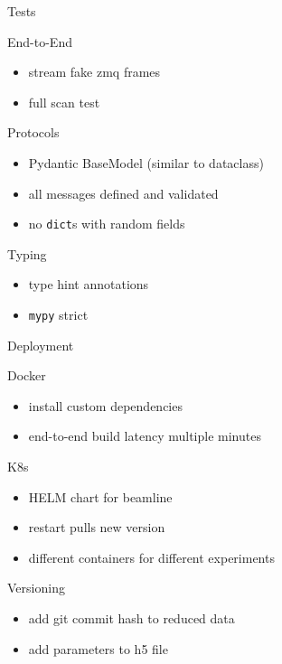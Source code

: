 \documentclass[aspectratio=169]{beamer}
\begin{document}
\begin{frame}{Tests}
 \begin{block}{End-to-End}
  \begin{itemize}
   \item stream fake zmq frames
   \item full scan test
  \end{itemize}

 \end{block}
 \begin{block}{Protocols}
  \begin{itemize}
   \item Pydantic BaseModel (similar to dataclass)
   \item all messages defined and validated
   \item no \texttt{dict}s with random fields
  \end{itemize}
 \end{block}

\begin{block}{Typing}
 \begin{itemize}
 \item type hint annotations
  \item \texttt{mypy} strict
 \end{itemize}

\end{block}


\end{frame}

\begin{frame}{Deployment}
 \begin{block}{Docker}
  \begin{itemize}
   \item install custom dependencies
   \item end-to-end build latency multiple minutes
  \end{itemize}
 \end{block}
 
 \begin{block}{K8s}
  \begin{itemize}
   \item HELM chart for beamline
   \item restart pulls new version
   \item different containers for different experiments
  \end{itemize}
 \end{block}
    
\begin{block}{Versioning}
 \begin{itemize}
  \item add git commit hash to reduced data
  \item add parameters to h5 file
 \end{itemize}

\end{block}

\end{frame}
\end{document}

